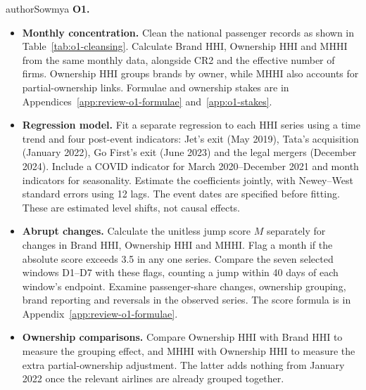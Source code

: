 \begin{authorcontribution}{authorSowmya}
\label{sec:method-o1}
\textbf{O1.}
\begin{itemize}[leftmargin=2em]
    \item \textbf{Monthly concentration.} Clean the national passenger records as shown in Table~\ref{tab:o1-cleansing}. Calculate Brand HHI, Ownership HHI and MHHI from the same monthly data, alongside CR2 and the effective number of firms. Ownership HHI groups brands by owner, while MHHI also accounts for partial-ownership links. Formulae and ownership stakes are in Appendices~\ref{app:review-o1-formulae} and~\ref{app:o1-stakes}.
    \item \textbf{Regression model.} Fit a separate regression to each HHI series using a time trend and four post-event indicators: Jet's exit (May 2019), Tata's acquisition (January 2022), Go First's exit (June 2023) and the legal mergers (December 2024). Include a COVID indicator for March 2020--December 2021 and month indicators for seasonality. Estimate the coefficients jointly, with Newey--West standard errors using 12 lags. The event dates are specified before fitting. These are estimated level shifts, not causal effects.
    \item \textbf{Abrupt changes.} Calculate the unitless jump score $M$ separately for changes in Brand HHI, Ownership HHI and MHHI. Flag a month if the absolute score exceeds 3.5 in any one series. Compare the seven selected windows D1--D7 with these flags, counting a jump within 40 days of each window's endpoint. Examine passenger-share changes, ownership grouping, brand reporting and reversals in the observed series. The score formula is in Appendix~\ref{app:review-o1-formulae}.
    \item \textbf{Ownership comparisons.} Compare Ownership HHI with Brand HHI to measure the grouping effect, and MHHI with Ownership HHI to measure the extra partial-ownership adjustment. The latter adds nothing from January 2022 once the relevant airlines are already grouped together.
\end{itemize}


\end{authorcontribution}

